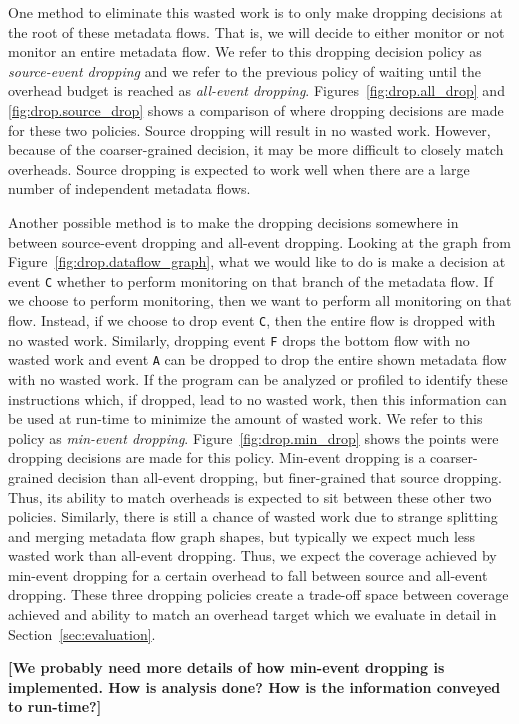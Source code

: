 One method to eliminate this wasted work is to only make dropping decisions at
the root of these metadata flows. That is, we will decide to either monitor or
not monitor an entire metadata flow. We refer to this dropping decision policy
as \emph{source-event dropping} and we refer to the previous policy of waiting until
the overhead budget is reached as \emph{all-event dropping}.
Figures~\ref{fig:drop.all_drop} and \ref{fig:drop.source_drop} shows a
comparison of where dropping decisions are made for these two policies. Source
dropping will
result in no wasted work. However, because of the coarser-grained decision, it
may be more difficult to closely match overheads. Source dropping is expected
to work well when there are a large number of independent metadata flows.

Another possible method is to make the dropping decisions somewhere in between
source-event dropping and all-event dropping. Looking at the graph from 
Figure~\ref{fig:drop.dataflow_graph}, what we would like to do is make a
decision at event {\tt C} whether to perform monitoring on that branch of the
metadata flow. If we choose to perform monitoring, then we want to perform all
monitoring on that flow. Instead, if we choose to drop event {\tt C}, then the
entire flow is dropped with no wasted work. Similarly, dropping event {\tt F}
drops the bottom flow with no wasted work and event {\tt A} can be dropped to
drop the entire shown metadata flow with no wasted work. If the program can be
analyzed or profiled to identify these instructions which, if dropped, lead to
no wasted work, then this information can be used at run-time to minimize the
amount of wasted work. We refer to this policy as \emph{min-event dropping}.
Figure~\ref{fig:drop.min_drop} shows the points were dropping decisions are
made for this policy.
Min-event dropping is a coarser-grained decision than all-event dropping, but
finer-grained that source dropping. Thus, its ability to match overheads is
expected to sit between these other two policies. Similarly, there is still a
chance of wasted work due to strange splitting and merging metadata flow graph
shapes, but typically we expect much less wasted work than all-event 
dropping. Thus, we expect the coverage achieved by min-event dropping for a
certain overhead to fall between source and all-event dropping. These three
dropping policies create a trade-off space between coverage achieved and
ability to match an overhead target which we evaluate in detail in
Section~\ref{sec:evaluation}.

\textbf{[We probably need more details of how min-event dropping is
implemented. How is analysis done? How is the information conveyed to
run-time?]}

